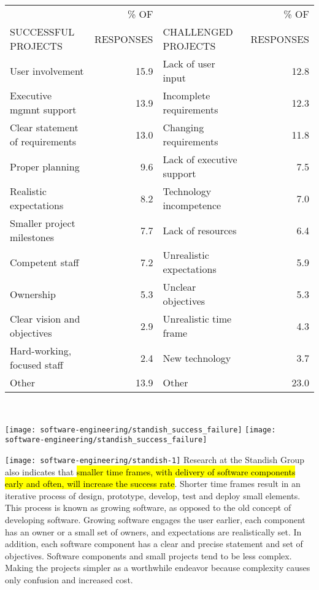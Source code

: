 {\footnotesize
\fi
\begin{tabular}[h]{lr|lr}
                  & \% OF &                        & \% OF \\
SUCCESSFUL PROJECTS & RESPONSES & CHALLENGED PROJECTS & RESPONSES \\
\hline
User involvement & 15.9 & Lack of user input & 12.8 \\
Executive mgmnt support & 13.9 & Incomplete requirements & 12.3 \\
Clear statement of requirements & 13.0 & Changing requirements & 11.8\\
Proper planning & 9.6 & Lack of executive support & 7.5 \\
Realistic expectations & 8.2 & Technology incompetence & 7.0 \\
Smaller project milestones & 7.7 & Lack of resources & 6.4 \\
Competent staff & 7.2 & Unrealistic expectations & 5.9 \\
Ownership & 5.3 & Unclear objectives & 5.3 \\
Clear vision and objectives & 2.9 & Unrealistic time frame & 4.3 \\
Hard-working, focused staff & 2.4 & New technology & 3.7 \\
Other & 13.9 & Other & 23.0 \\
\hline
\end{tabular}\\[2ex]
\ifslides
}
\fi
\begin{center}
\ifslides
\texttt{[image: software-engineering/standish\_success\_failure]}
\else
\texttt{[image: software-engineering/standish\_success\_failure]}
\fi
\end{center}
\ifslides
\newpage
\texttt{[image: software-engineering/standish-1]}
\newslide
\fi
  Research at the Standish Group also indicates that \hl{smaller time frames,
  with delivery of software components early and often, will increase the
  success rate}. Shorter time frames result in an iterative process
  of design, prototype, develop, test and deploy small elements. This
  process is known as growing software, as opposed to the old concept
  of developing software. Growing software engages the user earlier,
  each component has an owner or a small set of owners, and expectations
  are realistically set. In addition, each software component has a clear
  and precise statement and set of objectives. Software components
  and small projects tend to be less complex. Making the projects simpler
  as a worthwhile endeavor because complexity causes only confusion
  and increased cost.\\[2ex]
%
\newpage
